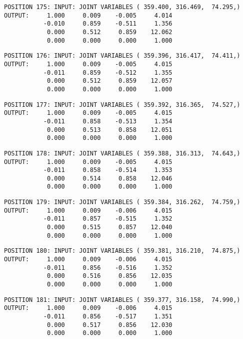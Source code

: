 \begin{verbatim}
POSITION 175: INPUT: JOINT VARIABLES ( 359.400, 316.469,  74.295,)
OUTPUT:     1.000     0.009    -0.005     4.014
           -0.010     0.859    -0.511     1.356
            0.000     0.512     0.859    12.062
            0.000     0.000     0.000     1.000
\end{verbatim} \pagebreak[1]\begin{verbatim}
POSITION 176: INPUT: JOINT VARIABLES ( 359.396, 316.417,  74.411,)
OUTPUT:     1.000     0.009    -0.005     4.015
           -0.011     0.859    -0.512     1.355
            0.000     0.512     0.859    12.057
            0.000     0.000     0.000     1.000
\end{verbatim} \pagebreak[1]\begin{verbatim}
POSITION 177: INPUT: JOINT VARIABLES ( 359.392, 316.365,  74.527,)
OUTPUT:     1.000     0.009    -0.005     4.015
           -0.011     0.858    -0.513     1.354
            0.000     0.513     0.858    12.051
            0.000     0.000     0.000     1.000
\end{verbatim} \pagebreak[1]\begin{verbatim}
POSITION 178: INPUT: JOINT VARIABLES ( 359.388, 316.313,  74.643,)
OUTPUT:     1.000     0.009    -0.005     4.015
           -0.011     0.858    -0.514     1.353
            0.000     0.514     0.858    12.046
            0.000     0.000     0.000     1.000
\end{verbatim} \pagebreak[1]\begin{verbatim}
POSITION 179: INPUT: JOINT VARIABLES ( 359.384, 316.262,  74.759,)
OUTPUT:     1.000     0.009    -0.006     4.015
           -0.011     0.857    -0.515     1.352
            0.000     0.515     0.857    12.040
            0.000     0.000     0.000     1.000
\end{verbatim} \pagebreak[1]\begin{verbatim}
POSITION 180: INPUT: JOINT VARIABLES ( 359.381, 316.210,  74.875,)
OUTPUT:     1.000     0.009    -0.006     4.015
           -0.011     0.856    -0.516     1.352
            0.000     0.516     0.856    12.035
            0.000     0.000     0.000     1.000
\end{verbatim} \pagebreak[1]\begin{verbatim}
POSITION 181: INPUT: JOINT VARIABLES ( 359.377, 316.158,  74.990,)
OUTPUT:     1.000     0.009    -0.006     4.015
           -0.011     0.856    -0.517     1.351
            0.000     0.517     0.856    12.030
            0.000     0.000     0.000     1.000
\end{verbatim} \pagebreak[1]\begin{verbatim}

\end{verbatim}
